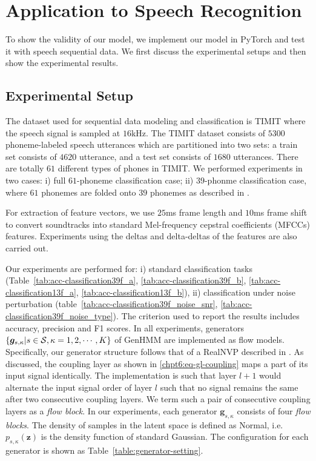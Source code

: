 \section{Application to Speech Recognition}\label{chpt:7:sec:app-speech-recog}
To show the validity of our model, we implement our model in PyTorch and test it with speech sequential data. We first discuss the experimental setups and then show the experimental results. 

\subsection{Experimental Setup}
The dataset used for sequential data modeling and classification is TIMIT where the speech signal is sampled at $16$kHz.
The TIMIT dataset consists of $5300$ phoneme-labeled speech utterances which are partitioned into two sets: {a train set consists of $4620$ utterance, and a test set consists of $1680$ utterances.} There are totally $61$ different types of phones in TIMIT.
We performed experiments in two cases: i) full $61$-phoneme classification case; ii) $39$-phonme classification case, where $61$ phonemes are folded onto $39$ phonemes as described in \cite{Perdigao11}.

For extraction of feature vectors, we use $25$ms frame length and $10$ms frame shift to convert soundtracks into standard Mel-frequency cepstral coefficients (MFCCs) features. Experiments using the deltas and delta-deltas of the features are also carried out.


Our experiments are performed for: i) standard classification tasks (Table~\ref{tab:acc-classification39f_a}, \ref{tab:acc-classification39f_b}, \ref{tab:acc-classification13f_a}, \ref{tab:acc-classification13f_b}), ii) classification under noise perturbation (table~\ref{tab:acc-classification39f_noise_snr}, \ref{tab:acc-classification39f_noise_type}). The criterion used to report the results includes accuracy, precision and F1 scores.
In all experiments, generators $\left\{\bm{g}_{s,\kappa}|s\in \mathcal{S}, \kappa=1, 2, \cdots, K \right\}$ of GenHMM are implemented as flow models. Specifically, our generator structure follows that of a RealNVP described in \cite{2016arXiv160508803D}.
As discussed, the coupling layer as shown in \eqref{chpt6:eq-gl-coupling} maps a part of its input signal identically.
The implementation is such that layer $l+1$ would alternate the input signal order of layer $l$ such that no signal remains the same after two consecutive coupling layers.
We term such a pair of consecutive coupling layers as a \textit{flow block}.
In our experiments, each generator $\bm{g}_{s,\kappa}$ consists of four \textit{flow blocks}.
The density of samples in the latent space is defined as Normal,
i.e. $p_{s,\kappa}(\bm{z})$ is the density function of standard
Gaussian. The configuration for each generator is shown as Table~\ref{table:generator-setting}.

